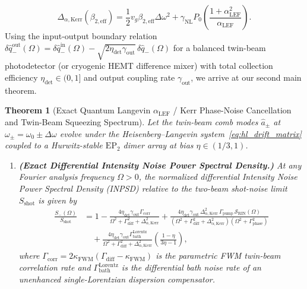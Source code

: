 \documentclass[11pt,letterpaper]{article}
\newtheorem{theorem}{Theorem}
\theoremstyle{definition}
\theoremstyle{remark}
\begin{document}
\begin{equation}
\Delta_{\alpha,\mathrm{Kerr}}\!\left(\beta_{2,\mathrm{eff}}\right) = \frac{1}{2}v_g \beta_{2,\mathrm{eff}}\Delta\omega^2 + \gamma_{\mathrm{NL}}P_0\left(\frac{1 + \alpha_{\mathrm{LEF}}^2}{\alpha_{\mathrm{LEF}}}\right).
\label{eq:delta_alpha_kerr}
\end{equation}
Using the input-output boundary relation $\delta\hat{q}_-^{\mathrm{out}}(\Omega) = \delta\hat{q}_-^{\mathrm{in}}(\Omega) - \sqrt{2\eta_{\mathrm{det}}\gamma_{\mathrm{out}}}\,\delta\hat{q}_-(\Omega)$ for a balanced twin-beam photodetector (or cryogenic HEMT difference mixer) with total collection efficiency $\eta_{\mathrm{det}} \in (0, 1]$ and output coupling rate $\gamma_{\mathrm{out}}$, we arrive at our second main theorem.

\begin{theorem}[Exact Quantum Langevin $\alpha_{\mathrm{LEF}}$ / Kerr Phase-Noise Cancellation and Twin-Beam Squeezing Spectrum]
\label{thm:quantum_squeezing}
Let the twin-beam comb modes $\hat{a}_\pm$ at $\omega_\pm = \omega_0 \pm \Delta\omega$ evolve under the Heisenberg--Langevin system~\eqref{eq:hl_drift_matrix} coupled to a Hurwitz-stable $\mathrm{EP}_2$ dimer array at bias $\eta \in (1/3, 1)$.
\begin{enumerate}
    \item[(a)] \textbf{(Exact Differential Intensity Noise Power Spectral Density.)} At any Fourier analysis frequency $\Omega > 0$, the normalized differential Intensity Noise Power Spectral Density (INPSD) relative to the two-beam shot-noise limit $S_{\mathrm{shot}}$ is given by
    \begin{align}
    \frac{S_-(\Omega)}{S_{\mathrm{shot}}} &= 1 - \frac{4\eta_{\mathrm{det}}\gamma_{\mathrm{out}}\Gamma_{\mathrm{corr}}}{\Omega^2 + \Gamma_{\mathrm{diff}}^2 + \Delta_{\alpha,\mathrm{Kerr}}^2} + \frac{4\eta_{\mathrm{det}}\gamma_{\mathrm{out}}\,\Delta_{\alpha,\mathrm{Kerr}}^2\,\Gamma_{\mathrm{pump}}\,\mathcal{S}_{\mathrm{RIN}}(\Omega)}{\left(\Omega^2 + \Gamma_{\mathrm{diff}}^2 + \Delta_{\alpha,\mathrm{Kerr}}^2\right)\left(\Omega^2 + \Gamma_{\mathrm{phase}}^2\right)} \nonumber\\
    &\quad + \frac{4\eta_{\mathrm{det}}\gamma_{\mathrm{out}}\Gamma_{\mathrm{bath}}^{\mathrm{Lorentz}}}{\Omega^2 + \Gamma_{\mathrm{diff}}^2 + \Delta_{\alpha,\mathrm{Kerr}}^2}\left(\frac{1 - \eta}{3\eta - 1}\right),
    \label{eq:thm2_inpsd_full}
    \end{align}
    where $\Gamma_{\mathrm{corr}} = 2\kappa_{\mathrm{FWM}}(\Gamma_{\mathrm{diff}} - \kappa_{\mathrm{FWM}})$ is the parametric FWM twin-beam correlation rate and $\Gamma_{\mathrm{bath}}^{\mathrm{Lorentz}}$ is the differential bath noise rate of an unenhanced single-Lorentzian dispersion compensator.

\end{enumerate}
\end{theorem}
\end{document}
